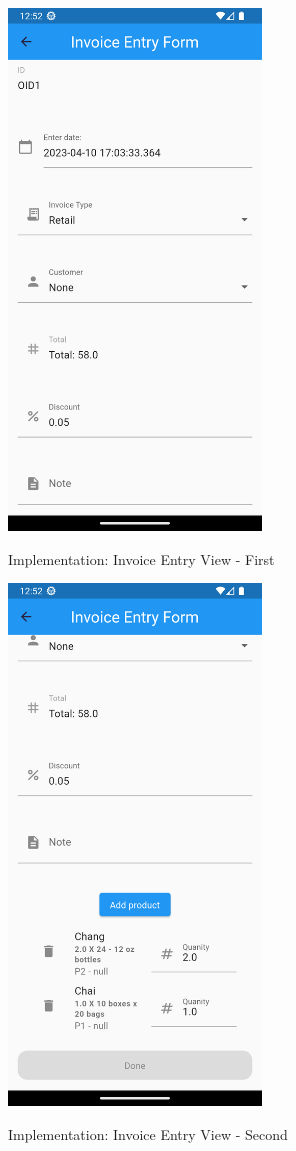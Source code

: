 \documentclass[../thesis.tex]{subfiles}
\begin{document}
\begin{figure}[H]
    \centering

    \caption{Implementation: Invoice Entry View - First}
    \includegraphics[width=0.60\textwidth]{images/InvoiceScreen_Entry1.png}
    \label{fig:InvoiceScreen_Entry1}

\end{figure}
\begin{figure}[H]
    \centering
    \caption{Implementation: Invoice Entry View - Second}
    \includegraphics[width=0.60\textwidth]{images/InvoiceScreen_Entry2.png}
    \label{fig:InvoiceScreen_Entry2}

\end{figure}
\end{document}
